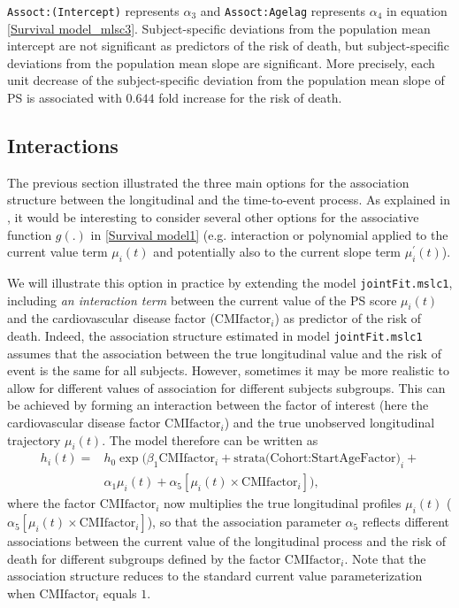 \documentclass[12pt]{article}
\begin{document}
\texttt{Assoct:(Intercept)} represents $\alpha_3$ and \texttt{Assoct:Agelag} represents $\alpha_4$ in equation \eqref{Survival model_mlsc3}. Subject-specific deviations from the population mean intercept are not significant as predictors of the risk of death, but subject-specific deviations from the population mean slope are significant. More precisely, each unit decrease of the subject-specific deviation from the population mean slope of PS is associated with $0.644$ fold increase for the risk of death.

\subsection{Interactions}
\label{interaction}
The previous section illustrated the three main options for the association structure between the longitudinal and the time-to-event process. As explained in \cite{JMbayes}, it would be interesting to consider several other options for the associative function $g(.)$ in \eqref{Survival model1} (e.g. interaction or polynomial applied to the current value term $\mu_i(t)$ and
potentially also to the current slope term $\mu_i^{'}(t)$). 

We will illustrate this option in practice by extending the model \texttt{jointFit.mslc1}, including \textit{an interaction term} between the current value of the PS score $\mu_i(t)$ and the cardiovascular disease factor ($\text{CMIfactor}_i$) as predictor of the risk of death. Indeed, the association structure estimated in model \texttt{jointFit.mslc1} assumes that the association between the true longitudinal value and the risk of event is the same for all subjects. However, sometimes it may be more realistic to allow for different values of association for different subjects subgroups. This can be achieved by forming an interaction between the factor of interest (here the cardiovascular disease factor $\text{CMIfactor}_i$) and the true unobserved longitudinal trajectory $\mu_i(t)$. The model therefore can be written as
\begin{equation}
\begin{split}
h_i(t) = &h_0 \exp \big(\beta_1 \text{CMIfactor}_i + \text{strata(Cohort:StartAgeFactor)}_i  + \\
& \alpha_1 \mu_i(t)  + \alpha_5 [\mu_i(t) \times \text{CMIfactor}_i ] \big),
\end{split}
\label{Survival model_mlsc4}
\end{equation}
where the factor $\text{CMIfactor}_i$ now multiplies the true longitudinal profiles $\mu_i(t)$ ($\alpha_5 [\mu_i(t) \times \text{CMIfactor}_i ]$), so that the association parameter $ \alpha_5$ reflects different associations between the current value of the longitudinal process and the risk of death for different subgroups defined by the factor $\text{CMIfactor}_i$. Note that the association structure reduces to the standard current value parameterization when $\text{CMIfactor}_i$ equals $1$.
\end{document}
